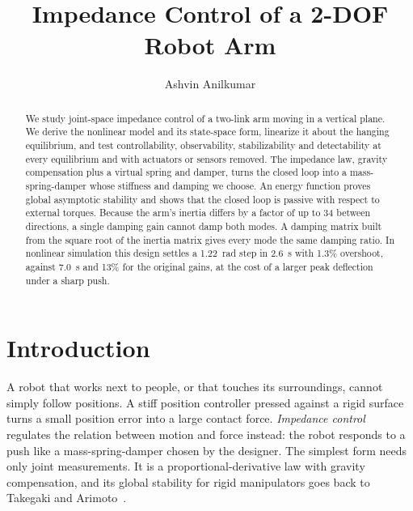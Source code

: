 \documentclass[letterpaper, 10pt, conference]{ieeeconf}
\title{\LARGE \bf
Impedance Control of a 2-DOF Robot Arm
}
\author{Ashvin Anilkumar}
\begin{document}
\maketitle
\thispagestyle{plain}
\pagestyle{plain}

\begin{abstract}
We study joint-space impedance control of a two-link arm
moving in a vertical plane. We derive the nonlinear model
and its state-space form, linearize it about the hanging
equilibrium, and test controllability, observability,
stabilizability and detectability at every equilibrium and
with actuators or sensors removed. The impedance law,
gravity compensation plus a virtual spring and damper,
turns the closed loop into a mass-spring-damper whose
stiffness and damping we choose. An energy function proves
global asymptotic stability and shows that the closed loop
is passive with respect to external torques. Because the
arm's inertia differs by a factor of up to 34 between
directions, a single damping gain cannot damp both modes.
A damping matrix built from the square root of the inertia
matrix gives every mode the same damping ratio. In
nonlinear simulation this design settles a 1.22~rad step in
2.6~s with 1.3\% overshoot, against 7.0~s and 13\% for the
original gains, at the cost of a larger peak deflection
under a sharp push.
\end{abstract}

\section{Introduction}

A robot that works next to people, or that touches its
surroundings, cannot simply follow positions. A stiff
position controller pressed against a rigid surface turns a
small position error into a large contact force.
\emph{Impedance control}~\cite{hogan1985impedance} regulates
the relation between motion and force instead: the robot
responds to a push like a mass-spring-damper chosen by the
designer. The simplest form needs only joint measurements.
It is a proportional-derivative law with gravity
compensation, and its global stability for rigid
manipulators goes back to Takegaki and
Arimoto~\cite{takegaki1981}.
\end{document}
